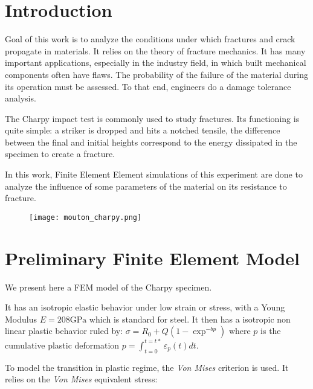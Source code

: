 \documentclass[
10pt, %
a4paper, %
oneside, %
headinclude,footinclude, %
BCOR5mm, %
]{scrartcl}
\begin{document}
\newpage %


\section{Introduction}
Goal of this work is to analyze the conditions under which fractures
and crack propagate in materials. It relies on the theory of fracture mechanics.
It has many important applications, especially in the industry field,
in which built mechanical components often have flaws.
The probability of the failure of the material during
its operation must be assessed.
To that end, engineers do a damage tolerance analysis.

The Charpy impact test is commonly used to study fractures.
Its functioning is quite simple: a striker is dropped and hits a
notched tensile, the difference between the final and initial heights
correspond to the energy dissipated in the specimen to create a fracture.

In this work, Finite Element Element simulations of this
experiment are done to analyze
the influence of some parameters of the material on its resistance
to fracture.

\begin{figure}[H]
    \centering
    \texttt{[image: mouton\_charpy.png]}
\end{figure}

\section{Preliminary Finite Element Model}

We present here a FEM model of the Charpy specimen.

It has an
isotropic elastic behavior under low strain or stress, with a
Young Modulus $E=208 \text{GPa}$ which is standard for steel.
It then has a isotropic non linear plastic behavior ruled by:
$ \sigma = R_0 + Q(1 - \exp^{-bp}) $ where $p$ is the cumulative
plastic deformation $\displaystyle p = \int_{t=0}^{t=t*}\varepsilon_{p}(t)dt$.

To model the transition in plastic regime, the \textit{Von Mises} criterion
is used. It relies on the \textit{Von Mises} equivalent stress:
\end{document}
